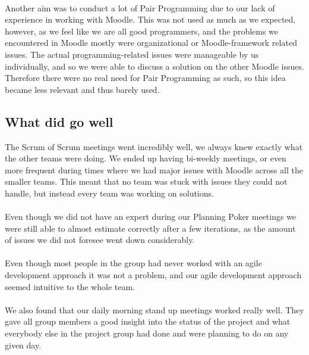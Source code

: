 \paragraph{}
Another aim was to conduct a lot of Pair Programming due to our lack of experience in working with Moodle.
This was not used as much as we expected, however, as we feel like we are all good programmers, and the problems we encountered in Moodle mostly were organizational or Moodle-framework related issues.
The actual programming-related issues were manageable by us individually, and so we were able to discuss a solution on the other Moodle issues. 
Therefore there were no real need for Pair Programming as such, so this idea became less relevant and thus barely used.

\subsection{What did go well}
The Scrum of Scrum meetings went incredibly well, we always knew exactly what the other teams were doing.
We ended up having bi-weekly meetings, or even more frequent during times where we had major issues with Moodle across all the smaller teams.
This meant that no team was stuck with issues they could not handle, but instead every team was working on solutions.

\paragraph{}
Even though we did not have an expert during our Planning Poker meetings we were still able to almost estimate correctly after a few iterations, as the amount of issues we did not foresee went down considerably.

\paragraph{}
Even though most people in the group had never worked with an agile development approach it was not a problem, and our agile development approach seemed intuitive to the whole team.

\paragraph{}
We also found that our daily morning stand up meetings worked really well. 
They gave all group members a good insight into the status of the project and what everybody else in the project group had done and were planning to do on any given day. 

